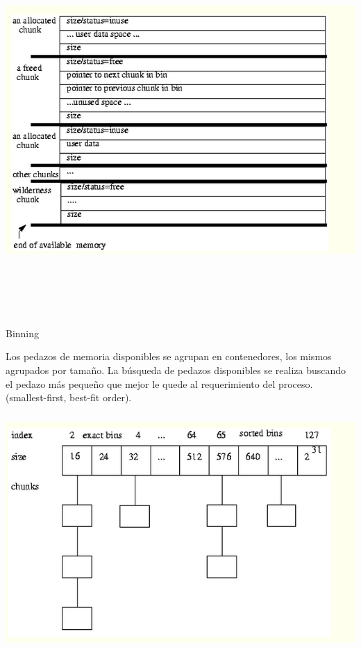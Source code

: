 \documentclass[11pt]{article} %
\begin{document}
\includegraphics[width=14cm,height=14cm]{imagenes/boundary.png}

Binning

Los pedazos de memoria disponibles se agrupan en contenedores, los mismos agrupados por tamaño.  La búsqueda de pedazos disponibles se realiza buscando el pedazo más pequeño que mejor le quede al requerimiento del proceso. (smallest-first, best-fit order).



\includegraphics[width=14cm,height=9cm]{imagenes/binning.png}
\end{document}
